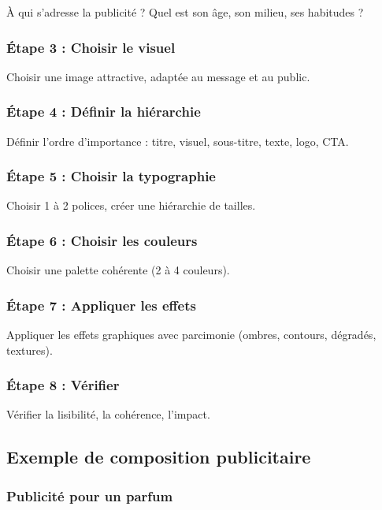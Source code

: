 À qui s'adresse la publicité ? Quel est son âge, son milieu, ses habitudes ?

\subsubsection{Étape 3 : Choisir le visuel}

Choisir une image attractive, adaptée au message et au public.

\subsubsection{Étape 4 : Définir la hiérarchie}

Définir l'ordre d'importance : titre, visuel, sous-titre, texte, logo, CTA.

\subsubsection{Étape 5 : Choisir la typographie}

Choisir 1 à 2 polices, créer une hiérarchie de tailles.

\subsubsection{Étape 6 : Choisir les couleurs}

Choisir une palette cohérente (2 à 4 couleurs).

\subsubsection{Étape 7 : Appliquer les effets}

Appliquer les effets graphiques avec parcimonie (ombres, contours, dégradés, textures).

\subsubsection{Étape 8 : Vérifier}

Vérifier la lisibilité, la cohérence, l'impact.

\subsection{Exemple de composition publicitaire}

\subsubsection{Publicité pour un parfum}

